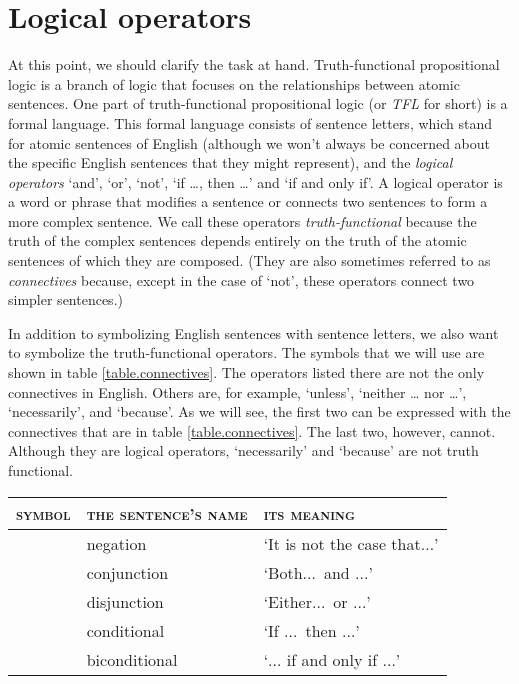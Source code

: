 


\chapter{Logical operators}
\label{s:TFLConnectives}

At this point, we should clarify the task at hand. Truth-functional propositional logic is a branch of logic that focuses on the relationships between atomic sentences. One part of truth-functional propositional logic (or \textit{TFL} for short) is a formal language. This formal language consists of sentence letters, which stand for atomic sentences of English (although we won't always be concerned about the specific English sentences that they might represent), and the \textit{logical operators} `and', `or', `not', `if \ldots, then \ldots' and `if and only if'. A logical operator is a word or phrase that modifies a sentence or connects two sentences to form a more complex sentence. We call these operators \textit{truth-functional} because the truth of the complex sentences depends entirely on the truth of the atomic sentences of which they are composed. (They are also sometimes referred to as \textit{connectives} because, except in the case of `not', these operators connect two simpler sentences.)  

In addition to symbolizing English sentences with sentence letters, we also want to symbolize the truth-functional operators. The symbols that we will use are shown in table \ref{table.connectives}. The operators listed there are not the only connectives in English. Others are, for example, `unless', `neither \dots{} nor \dots', `necessarily', and `because'. As we will see, the first two can be expressed with the connectives that are in table \ref{table.connectives}. The last two, however, cannot. Although they are logical operators, `necessarily' and `because' are not truth functional.
	
\begin{table*}\centering\sffamily\footnotesize
{}
\begin{tabular}{@{}l l l@{}}\toprule
\textsc{symbol} & \textsc{the sentence's name} & \textsc{its meaning}\\\midrule
	\enot&negation&`It is not the case that$\ldots$'\\
	\eand&conjunction&`Both$\ldots$\ and $\ldots$'\\
	\eor&disjunction&`Either$\ldots$\ or $\ldots$'\\
	\eif&conditional&`If $\ldots$\ then $\ldots$'\\
	\eiff&biconditional&`$\ldots$ if and only if $\ldots$'\\
\bottomrule
\end{tabular}
\caption{}\label{table.connectives}
\end{table*}
	
